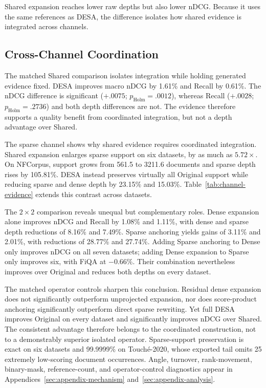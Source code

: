 

Shared expansion reaches lower raw depths but also lower nDCG. Because it uses the same references as DESA, the difference isolates how shared evidence is integrated across channels.

\subsection{Cross-Channel Coordination}

\label{cross-channel-coordination}

The matched Shared comparison isolates integration while holding generated evidence fixed. DESA improves macro nDCG by 1.61\% and Recall by 0.61\%. The nDCG difference is significant (\(+.0075\); \(p_{\mathrm{Holm}}=.0012\)), whereas Recall (\(+.0028\); \(p_{\mathrm{Holm}}=.2736\)) and both depth differences are not. The evidence therefore supports a quality benefit from coordinated integration, but not a depth advantage over Shared.

The sparse channel shows why shared evidence requires coordinated integration. Shared expansion enlarges sparse support on six datasets, by as much as \(5.72\times\). On NFCorpus, support grows from 561.5 to 3211.6 documents and sparse depth rises by 105.81\%. DESA instead preserves virtually all Original support while reducing sparse and dense depth by 23.15\% and 15.03\%. Table~\ref{tab:channel-evidence} extends this contrast across datasets.



The \(2\times2\) comparison reveals unequal but complementary roles. Dense expansion alone improves nDCG and Recall by 1.08\% and 1.11\%, with dense and sparse depth reductions of 8.16\% and 7.49\%. Sparse anchoring yields gains of 3.11\% and 2.01\%, with reductions of 28.77\% and 27.74\%. Adding Sparse anchoring to Dense only improves nDCG on all seven datasets; adding Dense expansion to Sparse only improves six, with FiQA at \(-0.66\%\). Their combination nevertheless improves over Original and reduces both depths on every dataset.

The matched operator controls sharpen this conclusion. Residual dense expansion does not significantly outperform unprojected expansion, nor does score-product anchoring significantly outperform direct sparse rewriting. Yet full DESA improves Original on every dataset and significantly improves nDCG over Shared. The consistent advantage therefore belongs to the coordinated construction, not to a demonstrably superior isolated operator. Sparse-support preservation is exact on six datasets and 99.9999\% on Touché-2020, whose exported tail omits 25 extremely low-scoring document occurrences. Angle, turnover, rank-movement, binary-mask, reference-count, and operator-control diagnostics appear in Appendices~\ref{sec:appendix-mechanism} and~\ref{sec:appendix-analysis}.

